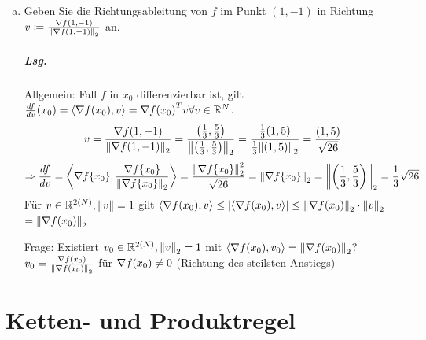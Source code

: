 \documentclass{scrreprt}
\newcommand\skalprod[1]{\left\langle #1 \right\rangle}
\begin{document}
\begin{enumerate}[a)]
 \newpage
\item Geben Sie die Richtungsableitung von $f$ im Punkt $(1, -1)$ in Richtung
  $v \coloneqq \frac{\nabla f(1, -1)}{\norm{\nabla f(1, -1)}_2}$ an.
  \subparagraph{Lsg.} Allgemein: Fall $f$ in $x_0$ differenzierbar ist, gilt
  $\frac{df}{dv} (x_0) = \skalprod{\nabla f\qty(x_0), v} = \nabla f\qty(x_0)^T v \forall v \in \mathbb{R}^N$.
  \[
    v = \frac{\nabla f(1, -1)}{\norm{\nabla f(1, -1)}_2}
    = \frac{\qty(\frac{1}{3}, \frac{5}{3})}{\norm{\qty(\frac{1}{3}, \frac{5}{3})}_2}
    = \frac{\frac{1}{3}(1,5)}{\frac{1}{3} \norm{(1, 5)}_2} = \frac{(1, 5)}{\sqrt{26}}
  \]
  \[
    \Rightarrow \frac{df}{dv} = \skalprod{\nabla f\qty{x_0}, \frac{\nabla f\qty{x_0}}{\norm{\nabla f\qty{x_0}}_2}}
    = \frac{\norm{\nabla f\qty{x_0}}_2^2}{\sqrt{26}}
    = \norm{\nabla f\qty{x_0}}_2 = \norm{\qty(\frac{1}{3}, \frac{5}{3})}_2
    = \frac{1}{3}\sqrt{26}
  \]
  Für $v \in \mathbb{R}^{2(N)}, \norm{v} = 1$ gilt
  $\skalprod{\nabla f\qty(x_0), v} \leq \abs{\skalprod{\nabla f\qty(x_0), v}} \leq \norm{\nabla f\qty(x_0)}_2 \cdot \norm{v}_2$
  $= \norm{\nabla f\qty(x_0)}_2$.

  Frage: Existiert $v_0 \in \mathbb{R}^{2(N)}, \norm{v}_2 = 1$ mit
  $\skalprod{\nabla f\qty(x_0), v_0} = \norm{\nabla f\qty(x_0)}_2$?
  $v_0 = \frac{\nabla f\qty(x_0)}{\norm{\nabla f\qty(x_0)}_2}$ für $\nabla f\qty(x_0) \ne 0$
  (Richtung des steilsten Anstiegs)
\end{enumerate}

\section*{Ketten- und Produktregel}
\end{document}
